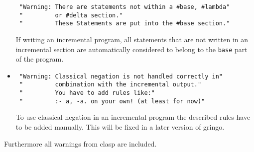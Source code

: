 \documentclass[a4paper,10pt]{article}
\begin{document}
\begin{itemize}
\begin{verbatim}
 "Warning: There are statements not within a #base, #lambda"
 "         or #delta section."
 "         These Statements are put into the #base section."
\end{verbatim}
If writing an incremental program, all statements that are not written in an incremental section are automatically considered to belong to the \texttt{base} part of the program.
\item
\begin{verbatim}
 "Warning: Classical negation is not handled correctly in"
 "         combination with the incremental output."
 "         You have to add rules like:"
 "         :- a, -a. on your own! (at least for now)"
\end{verbatim}
To use classical negation in an incremental program the described rules have to be added manually. This will be fixed in a later version of gringo.
\end{itemize}
Furthermore all warnings from clasp are included.
\end{document}
